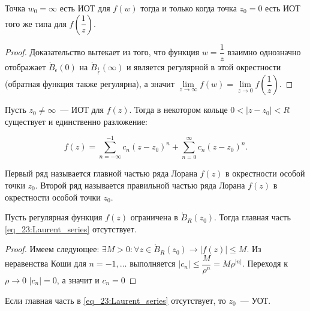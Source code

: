 \begin{statement} \label{23:ISP_of_1/z}
    Точка \(w_0 = \infty\) есть ИОТ для \(f(w)\) тогда и только когда точка \(z_0 = 0\) есть ИОТ
    того же типа для \(f(\dfrac{1}{z})\).
\end{statement}

\begin{proof}
    Доказательство вытекает из того, что функция \(w = \dfrac{1}{z}\) взаимно однозначно отображает
    \(\mathring{B}_\epsilon(0)\) на \(\mathring{B}_{\frac{1}{\epsilon}}(\infty)\) и является
    регулярной в этой окрестности (обратная функция также регулярна), а значит \(\lim\limits_{z
    \rightarrow \infty} f(w) = \lim\limits_{z \rightarrow 0} f\left(\dfrac{1}{z}\right)\).
\end{proof}

Пусть \(z_0 \ne \infty\)~--- ИОТ для \(f(z)\). Тогда в некотором кольце \(0 < |z - z_0| < R\)
существует и единственно разложение:

\begin{equation}
f(z) = \sum\limits_{n = -\infty}^{-1} c_n (z-z_0)^n + \sum\limits_{n=0}^{\infty} c_n (z-z_0)^n.
 \label{eq_23:Laurent_series}
\end{equation}

\begin{definition}
    Первый ряд называется главной частью ряда Лорана \(f(z)\) в окрестности особой точки \(z_0\).
    Второй ряд называется правильной частью ряда Лорана \(f(z)\) в окрестности особой точки \(z_0\).
\end{definition}

\begin{statement} \label{23:principal_part_of_bounded_reg_func}
    Пусть регулярная функция \(f(z)\) ограничена в \(\mathring{B}_R(z_0)\). Тогда главная часть
    \eqref{eq_23:Laurent_series} отсутствует.
\end{statement}

\begin{proof}
    Имеем следующее: \(\exists M > 0 \colon \forall z \in \mathring{B}_R(z_0) \rightarrow |f(z)|
    \le M\). Из неравенства Коши для \(n = -1, \dots\) выполняется \(|c_{n}| \le \dfrac{M}
    {\rho^{n}} = M\rho^{|n|}\). Переходя к \(\rho \rightarrow 0\) \(|c_n| = 0\), а значит и \(c_n
    = 0\)
\end{proof}

\begin{statement} \label{23:sufficient_cond_of_removable_point}
    Если главная часть в \eqref{eq_23:Laurent_series} отсутствует, то \(z_0\)~--- УОТ.
\end{statement}
